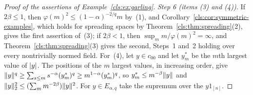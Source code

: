 \begin{proof}[Proof of the assertions of Example~\ref{cls:ex:garling}]
\emph{Step 6 (items (3) and (4)).} If $2\beta\le1$, then $\varphi(m)^2\le(1-\alpha)^{-2/q}m$ by~(1), and
Corollary~\ref{cls:cor:symmetric-examples}, which holds for spreading spaces by Theorem~\ref{cls:thm:spreading}(2), gives
the first assertion of~(3); if $2\beta<1$, then $\sup_mm/\varphi(m)^2=\infty$, and Theorem~\ref{cls:thm:spreading}(3)
gives the second, Steps~1 and~2 holding over every nontrivially normed field. For~(4), let $y\in c_{00}$ and let $y^*_m$
be the $m$th largest value of $\lvert y\rvert$. The positions of the $m$ largest values, in increasing order, give
$\lVert y\rVert^q\ge\sum_{s\le m}s^{-\alpha}(y^*_m)^q\ge m^{1-\alpha}(y^*_m)^q$, so $y^*_m\le m^{-\beta}\lVert y\rVert$ and
$\lVert y\rVert_2^2\le(\sum_mm^{-2\beta})\lVert y\rVert^2$. For $y\in E_{\alpha,q}$ take the supremum over the $y1_{[n]}$.
\end{proof}
